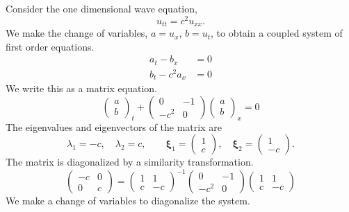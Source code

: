 Consider the one dimensional wave equation,
\[
u_{t t} = c^2 u_{x x}.
\]
We make the change of variables, $a = u_x$, $b = u_t$, to obtain a coupled 
system of first order equations.
\begin{align*}
  a_t - b_x &= 0 \\
  b_t - c^2 a_x &= 0
\end{align*}
We write this as a matrix equation.
\[
\begin{pmatrix} a \\ b \end{pmatrix}_t + 
\begin{pmatrix} 0 & -1 \\ -c^2 & 0 \end{pmatrix}
\begin{pmatrix} a \\ b \end{pmatrix}_x = 0
\]
The eigenvalues and eigenvectors of the matrix are 
\[
\lambda_1 = -c, \quad \lambda_2 = c, \qquad 
\boldsymbol{\xi}_1 = \begin{pmatrix} 1 \\ c \end{pmatrix}, \quad 
\boldsymbol{\xi}_2 = \begin{pmatrix} 1 \\ -c \end{pmatrix}.
\]
The matrix is diagonalized by a similarity transformation.
\[
\begin{pmatrix} -c & 0 \\ 0 & c \end{pmatrix}
=
\begin{pmatrix} 1 & 1 \\ c & -c \end{pmatrix}^{-1} 
\begin{pmatrix} 0 & -1 \\ -c^2 & 0 \end{pmatrix}
\begin{pmatrix} 1 & 1 \\ c & -c \end{pmatrix}
\]
We make a change of variables to diagonalize the system.
